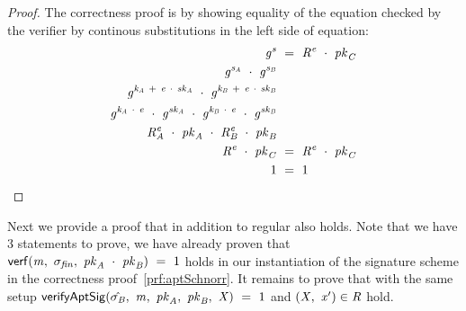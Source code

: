 \begin{proof}
    \label{prf:aptSchnorr}
    The correctness proof is by showing equality of the equation checked by the verifier by continous substitutions in the left side of equation:
    \begin{align}
        \mathit{g}^{\mathit{s}} &~=~ \mathit{R}^{\mathit{e}} ~\cdot~ \mathit{pk}_{\mathit{C}} \\
        \mathit{g}^{\mathit{s}_{\mathit{A}}} ~\cdot~ \mathit{g}^{\mathit{s}_{\mathit{B}}} & \\
        \mathit{g}^{\mathit{\mathit{k}_{\mathit{A}}} ~+~ \mathit{e} ~\cdot~ \mathit{sk}_{\mathit{A}}} ~\cdot~ \mathit{g}^{\mathit{\mathit{k}_{\mathit{B}}} ~+~ \mathit{e} ~\cdot~ \mathit{sk}_{\mathit{B}}} & \\
        \mathit{g}^{\mathit{\mathit{k}_{\mathit{A}}} ~\cdot~ \mathit{e}} ~\cdot~ \mathit{g}^{\mathit{sk}_{\mathit{A}}} ~\cdot~ \mathit{g}^{\mathit{\mathit{k}_{\mathit{B}}} ~\cdot~ \mathit{e}} ~\cdot~ \mathit{g}^{\mathit{sk}_{\mathit{B}}} & \\
        \mathit{R}_{\mathit{A}}^{\mathit{e}} ~\cdot~ \mathit{pk}_{\mathit{A}} ~\cdot~ \mathit{R}_{\mathit{B}}^{\mathit{e}} ~\cdot~ \mathit{pk}_{\mathit{B}} & \\
        \mathit{R}^{\mathit{e}} ~\cdot~ \mathit{pk}_{\mathit{C}} & ~=~ \mathit{R}^{\mathit{e}} ~\cdot~ \mathit{pk}_{\mathit{C}} \\
        1 & ~=~ 1
    \end{align}
\end{proof}

Next we provide a proof that in addition to regular \cnstCorrectness also \cnstAptSigCorrectness holds.
Note that we have 3 statements to prove, we have already proven that $\mathsf{verf}(\mathit{m} ,~ \sigma_{\mathit{fin}} ,~ \mathit{pk}_{\mathit{A}} ~\cdot~ \mathit{pk}_{\mathit{B}}) ~=~ 1$ holds in our instantiation of the signature scheme in the
correctness proof~\ref{prf:aptSchnorr}.
It remains to prove that with the same setup $\mathsf{verifyAptSig}(\hat{\sigma_{\mathit{B}}} ,~ \mathit{m} ,~ \mathit{pk}_{\mathit{A}} ,~ \mathit{pk}_{\mathit{B}} ,~ \mathit{X}) ~=~ 1$ and
$(\mathit{X} ,~ \mathit{x}') \in \mathit{R}$ hold.

